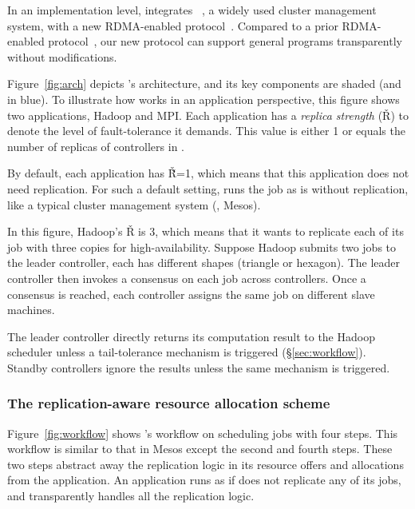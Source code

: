 In an implementation level, \tripod integrates \mesos~\cite{mesos:nsdi11}, a 
widely 
used cluster management system, with a new RDMA-enabled \paxos 
protocol~\cite{falcon:github}. Compared to a prior RDMA-enabled \paxos 
protocol~\cite{dare:hpdc15}, our new protocol can support general programs 
transparently without modifications.

Figure~\ref{fig:arch} depicts \tripod's architecture, and its key components 
are 
shaded (and in blue). To illustrate how \tripod works in an application 
perspective, this figure shows two applications, Hadoop and MPI. Each 
application has a \emph{replica strength} (\v{R}) to denote the level of 
fault-tolerance it demands. This value is either 1 or equals the number of 
replicas of controllers in \tripod.

By default, each application has \v{\v{R}=1}, which means that this application 
does not need replication. For such a default setting, \tripod runs the job as 
is 
without replication, like a typical cluster management system (\eg, Mesos).

In this figure, Hadoop's \v{R} is 3, which means that it wants to replicate 
each of its job with three copies for high-availability. Suppose Hadoop 
submits two jobs to the leader controller, each has different shapes (triangle 
or hexagon). The leader controller then invokes a consensus on each job across 
controllers. Once a consensus is reached, each controller assigns the same job 
on different slave machines.

The leader controller directly returns its computation result to the Hadoop 
scheduler unless a tail-tolerance mechanism is triggered 
(\S\ref{sec:workflow}). 
Standby controllers ignore the results unless the same mechanism is triggered.

\vspace{-.15in}\subsubsection{The replication-aware resource allocation scheme}
\label{sec:detect-arch}\vspace{-.075in}

Figure~\ref{fig:workflow} shows \xxx's workflow on scheduling jobs with four 
steps. This workflow is similar to that in Mesos except the second and fourth 
steps. These two steps \tripod abstract away the replication logic in its 
resource offers and allocations from the application. An application runs as if 
\xxx does not replicate any of its jobs, and \tripod transparently handles all 
the replication logic.

